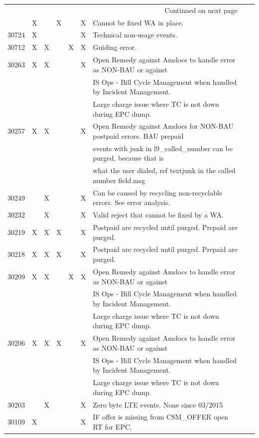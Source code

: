 \documentclass[12pt,twoside]{article}
\begin{document}
\begin{landscape}
\begin{longtable}{l|l|l|l|l|l|l|l|l}
\hline
\endhead
\hline\multicolumn{7}{r}{Continued on next page} \\
\endfoot
\endlastfoot
\hline
30728 & X &  & X &  & X & Cannot be fixed WA in place.\\
30724 & X &  &  &  & X & Technical non-usage events.\\
30712 & X & X &  & X & X & Guiding error.\\
30263 & X & X &  &  & X & Open Remedy against Amdocs to handle error as NON-BAU or against\\
&  &  &  &  &  & IS Ops - Bill Cycle Management when handled by Incident Management.\\
&  &  &  &  &  & Large charge issue where TC is not down during EPC dump.\\
30257 & X & X &  &  & X & Open Remedy against Amdocs for NON-BAU postpaid errors.  BAU prepaid\\
&  &  &  &  &  & events with junk in l9\_called\_number can be purged, because that is\\
&  &  &  &  &  & what the user dialed, ref  textjunk in the called number field.msg\\
30249 &  & X &  &  & X & Can be caused by recycling non-recyclable errors.  See error analysis.\\
30232 &  & X &  &  & X & Valid reject that cannot be fixed by a WA.\\
30219 & X & X & X &  & X & Postpaid are recycled until purged.  Prepaid are purged.\\
30218 & X & X & X &  & X & Postpaid are recycled until purged.  Prepaid are purged.\\
30209 & X & X &  & X & X & Open Remedy against Amdocs to handle error as NON-BAU or against\\
&  &  &  &  &  & IS Ops - Bill Cycle Management when handled by Incident Management.\\
&  &  &  &  &  & Large charge issue where TC is not down during EPC dump.\\
30206 & X & X & X &  & X & Open Remedy against Amdocs to handle error as NON-BAU or against\\
&  &  &  &  &  & IS Ops - Bill Cycle Management when handled by Incident Management.\\
&  &  &  &  &  & Large charge issue where TC is not down during EPC dump.\\
30203 &  & X &  &  & X & Zero byte LTE events.  None since 03/2015\\
30109 & X &  &  &  & X & IF offer is missing from CSM\_OFFER open RT for EPC,\\

\end{longtable}
\end{landscape}
\end{document}
